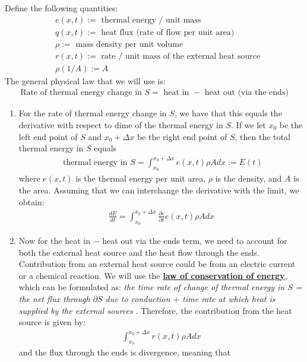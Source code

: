 \documentclass[11pt]{scrartcl}
\theoremstyle{definition}
\theoremstyle{remark}
\newcommand{\dfn}[1]{\textbf{\underline{#1}}}
\newcommand{\idx}[2]{\int_{#1}^{#2}}
\begin{document}
Define the following quantities: 
\begin{align*}
	& e(x,t) := \text{ thermal energy / unit mass } \\
	& q(x,t) := \text{ heat flux (rate of flow per unit area) } \\
	& \rho := \text{ mass density per unit volume} \\
	& r(x,t) := \text{ rate / unit mass of the external heat source} 	\\
	& \rho(1/A) := A 
\end{align*} 
The general physical law that we will use is: 
\begin{align*}
	\text{ Rate of thermal energy change in } S =  \text{ heat in } - \text{ heat out (via the ends) }
\end{align*} 
\begin{enumerate}[noitemsep]
	\item For the rate of thermal energy change in $S$, we have that this equals the derivative with respect to dime of the thermal energy in $S$. If we let $x_0$ be the left end point of $S$ and $x_0 + \Delta x$ be the right end point of $S$, then the total thermal energy in $S$ equals
	\begin{align}
		\text{ thermal energy in } S = \int_{x_0}^{x_0 + \Delta x} e(x,t) \rho A dx := E(t) 
	\end{align}
	where $e(x,t)$ is the thermal energy per unit area, $\rho$ is the density, and $A$ is the area. Assuming that we can interchange the derivative with the limit, we obtain: 
	\begin{align}
		\frac{dE}{dt} = \idx{x_0}{x_0 + \Delta x} \frac{\partial e}{\partial t} e(x,t) \rho A dx 	
	\end{align}
	\item Now for the heat in $-$ heat out via the ends term, we need to account for both the external heat source and the heat flow through the ends. Contribution from an external heat source could be from an electric current or a chemical reaction. We will use the \dfn{law of conservation of energy}, which can be formulated as: \emph{the time rate of change of thermal energy in $S$ = the net flux through $\partial S$ due to conduction $+$ time rate at which heat is supplied by the external sources }. Therefore, the contribution from the heat source is given by: 
	\begin{align*}
		\idx{x_0}{x_0 + \Delta x} r(x,t) \rho A dx 	
	\end{align*}
	and the flux through the ends is divergence, meaning that

\end{enumerate}
\end{document}
